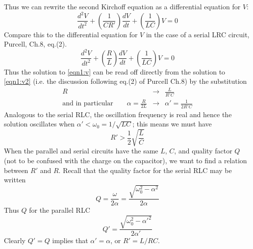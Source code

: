 \documentclass[makesolutionspdf]{esg8022pset}
\begin{document}
\begin{solution}
  Thus we can rewrite the second Kirchoff equation as a differential
  equation for $V$:
  \begin{equation}\label{eqn1:v}
  \frac{d^2V}{dt^2}+\left(\frac{1}{CR'}\right)\frac{dV}{dt}+\left(\frac{1}{LC}\right)V=0
  \end{equation}
  Compare this to the differential equation for $V$ in the case of a
  serial LRC circuit, Purcell, Ch.8, eq.(2).
  \begin{equation}\label{eqn1:v2}
  \frac{d^2V}{dt^2}+\left(\frac{R}{L}\right)\frac{dV}{dt}+\left(\frac{1}{LC}\right)V=0
  \end{equation}
  Thus the solution to \autoref{eqn1:v} can be read off directly
  from the solution to \autoref{eqn1:v2} (i.e. the discussion
  following eq.(2) of Purcell Ch.8) by the substitution
  \begin{align}
  R &\rightarrow & \frac{L}{R'C}\\ \text{and in particular}\qquad
  \alpha=\frac{R}{2L} &\rightarrow & \alpha'=\frac{1}{2R'C}
  \end{align}
  Analogous to the serial RLC, the oscillation frequency is real and hence
  the solution oscillates when $\alpha'<\omega_0=1/\sqrt{LC}$; this
  means we must have
  \begin{equation}
  R'>\frac{1}{2}\sqrt{\frac{L}{C}}
  \end{equation}
  When the parallel and serial circuits have the same $L$, $C$, and quality
  factor $Q$ (not to be confused with the charge on the capacitor), we
  want to find a relation between $R'$ and $R$.  Recall that the quality
  factor for the serial RLC may be written
  \begin{equation}
  Q=\frac{\omega}{2\alpha}=\frac{\sqrt{\omega_0^2-\alpha^2}}{2\alpha}
  \end{equation}
  Thus $Q$ for the parallel RLC
  \begin{equation}
  Q'=\frac{\sqrt{\omega_0^2-\alpha'^2}}{2\alpha'}
  \end{equation}
  Clearly $Q'=Q$ implies that $\alpha'=\alpha$, or $R'=L/RC$.

\end{solution}
\end{document}
